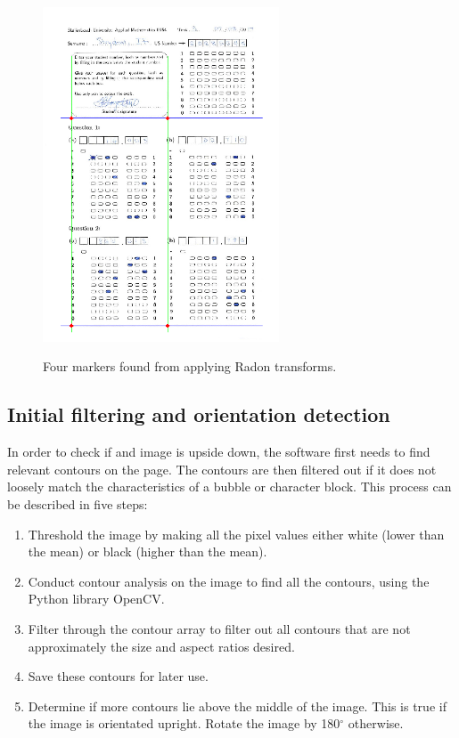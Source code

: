 \begin{figure}
  \centering
  \includegraphics[width=7cm]{RadonResults}\\
  \caption{Four markers found from applying Radon transforms.}
  \label{fig:radonResults}
\end{figure}

\subsection{Initial filtering and orientation detection}
\label{sec:InitImageFilter}

In order to check if and image is upside down, the software first needs to find relevant contours on the page. The contours are then filtered out if it does not loosely match the characteristics of a bubble or character block. This process can be described in five steps:

\begin{enumerate}
\item Threshold the image by making all the pixel values either white (lower than the mean) or black (higher than the mean).
\item Conduct contour analysis on the image to find all the contours, using the Python library OpenCV.
\item Filter through the contour array to filter out all contours that are not approximately the size and aspect ratios desired.
\item Save these contours for later use.
\item Determine if more contours lie above the middle of the image. This is true if the image is orientated upright. Rotate the image by 180$^{\circ}$ otherwise.
\end{enumerate}

